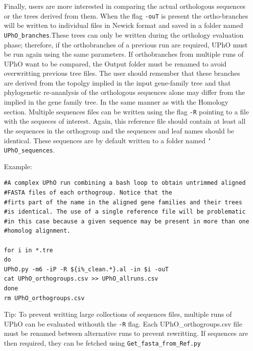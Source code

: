 \documentclass[10pt]{article}
\begin{document}
Finally, users are more interested in comparing the actual orthologous sequences
or the trees derived from them. When the flag
\texttt{-ouT} is present the ortho-branches will be written to
individual files in Newick format and saved  in a folder named
\texttt{UPhO\_branches}.These trees can only be written during the
orthology evaluation phase; therefore, if the orthobranches of a previous run
are required, UPhO must be run again using the same parameters. If
orthobranches from multiple runs of UPhO want to be compared, the
Output folder must be renamed to avoid overwritting previous tree
files. The user should remember that these branches are derived from
the topolgy implied in the input gene-family tree and that phylogenetic 
re-ananlysis  of the orthologous sequences alone may differ from the
implied in the gene family tree.  In the same manner as with the
Homology section. Multiple sequences files can be written using the
flag \texttt{-R} pointing to a file with the sequeces of
interest. Again, this reference file should contain at least all the
sequences in the orthogroup and the sequences and leaf names should be
identical. These sequences are by default written to a folder named
\texttt{\char`\\UPhO\_sequences}.

Example:

\begin{verbatim} 
#A complex UPhO run combining a bash loop to obtain untrimmed aligned 
#FASTA files of each orthogroup. Notice that the
#firts part of the name in the aligned gene families and their trees
#is identical. The use of a single reference file will be problematic
#in this case because a given sequence may be present in more than one
#homolog alignment.

for i in *.tre 
do 
UPhO.py -m6 -iP -R ${i%_clean.*}.al -in $i -ouT 
cat UPhO_orthogroups.csv >> UPhO_allruns.csv 
done 
rm UPhO_orthogroups.csv

\end{verbatim}

Tip: To prevent writting large collections of sequences files, multiple
runs of UPhO can be evaluated withouth the \texttt{-R} flag. Each
UPhO\_orthogroups.csv file must be renamed between alternative runs to
prevent rewritting. If sequences are then required, they can be fetched 
using \texttt{Get\_fasta\_from\_Ref.py}
\end{document}
